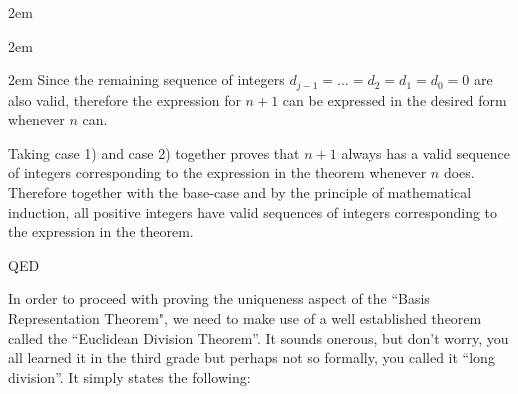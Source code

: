 \documentclass{article}
\newenvironment{jprIn}{\begin{adjustwidth}{2em}{}}{\end{adjustwidth}}
\begin{document}
\begin{jprIn}
\begin{jprIn}
\begin{jprIn}
Since the remaining sequence of integers $d_{j-1}=\dots{}=d_2=d_1=d_0=0$ are also valid, 
therefore the expression for $n+1$ can
be expressed in the desired form whenever $n$ can.
%
%
\end{jprIn}
\end{jprIn}
Taking case 1) and case 2) together proves that $n+1$
always has a valid sequence of integers corresponding to the expression in the theorem whenever $n$ does.
Therefore together with the base-case and by the principle of mathematical induction,
all positive integers
have valid sequences of integers corresponding to the expression in the theorem.

QED
\end{jprIn}
\bigskip

In order to proceed
with proving the uniqueness aspect of the ``Basis Representation Theorem", we
need to make use of a well established theorem
called the ``Euclidean Division Theorem''.
It sounds onerous, but don't worry, you all learned it
in the third grade but perhaps not so formally, you called it ``long division''. It simply states the following:
\end{document}
